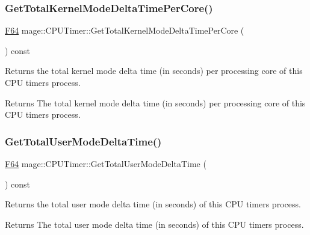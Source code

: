 \subsubsection{\texorpdfstring{Get\+Total\+Kernel\+Mode\+Delta\+Time\+Per\+Core()}{GetTotalKernelModeDeltaTimePerCore()}}
{\footnotesize\ttfamily \hyperlink{namespacemage_ad26233bbec640deda836e572c1a23708}{F64} mage\+::\+C\+P\+U\+Timer\+::\+Get\+Total\+Kernel\+Mode\+Delta\+Time\+Per\+Core (\begin{DoxyParamCaption}{ }\end{DoxyParamCaption}) const\hspace{0.3cm}{\ttfamily [noexcept]}}

Returns the total kernel mode delta time (in seconds) per processing core of this C\+PU timer\textquotesingle{}s process.

\begin{DoxyReturn}{Returns}
The total kernel mode delta time (in seconds) per processing core of this C\+PU timer\textquotesingle{}s process. 
\end{DoxyReturn}
\hypertarget{classmage_1_1_c_p_u_timer_aeff891594a11dba36c73442d04a430c8}{}\label{classmage_1_1_c_p_u_timer_aeff891594a11dba36c73442d04a430c8} 
\subsubsection{\texorpdfstring{Get\+Total\+User\+Mode\+Delta\+Time()}{GetTotalUserModeDeltaTime()}}
{\footnotesize\ttfamily \hyperlink{namespacemage_ad26233bbec640deda836e572c1a23708}{F64} mage\+::\+C\+P\+U\+Timer\+::\+Get\+Total\+User\+Mode\+Delta\+Time (\begin{DoxyParamCaption}{ }\end{DoxyParamCaption}) const\hspace{0.3cm}{\ttfamily [noexcept]}}

Returns the total user mode delta time (in seconds) of this C\+PU timer\textquotesingle{}s process.

\begin{DoxyReturn}{Returns}
The total user mode delta time (in seconds) of this C\+PU timer\textquotesingle{}s process. 
\end{DoxyReturn}
\hypertarget{classmage_1_1_c_p_u_timer_a7eb10c5f750f03ad5e19f0b29ee4851c}{}\label{classmage_1_1_c_p_u_timer_a7eb10c5f750f03ad5e19f0b29ee4851c} 
